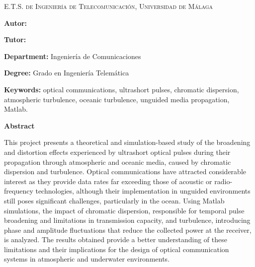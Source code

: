 
\pagestyle{fancy}

\begin{center}
	\scshape
	E.T.S. de Ingeniería de Telecomunicación, Universidad de Málaga
\end{center}

\bigskip

\begin{center}
	\Large \scshape
	\textbf{\tfgtitlenameENG}
\end{center}

\bigskip \bigskip \bigskip

\begin{minipage}{\textwidth}

\textbf{Autor:} \tfgauthorname

\medskip

\textbf{Tutor:} \tfgtutorname



\medskip


\textbf{Department:} Ingeniería de Comunicaciones

\medskip

\textbf{Degree:} Grado en Ingeniería Telemática

\medskip

\textbf{Keywords:} optical communications, ultrashort pulses, chromatic dispersion, atmospheric turbulence, oceanic turbulence, unguided media propagation, Matlab.

\bigskip \bigskip


\end{minipage}

\begin{center}
	\textbf{Abstract}
\end{center}


This project presents a theoretical and simulation-based study of the broadening and distortion effects experienced by ultrashort optical pulses during their propagation through atmospheric and oceanic media, caused by chromatic dispersion and turbulence. Optical communications have attracted considerable interest as they provide data rates far exceeding those of acoustic or radio-frequency technologies, although their implementation in unguided environments still poses significant challenges, particularly in the ocean.
Using Matlab simulations, the impact of chromatic dispersion, responsible for temporal pulse broadening and limitations in transmission capacity, and turbulence, introducing phase and amplitude fluctuations that reduce the collected power at the receiver, is analyzed. The results obtained provide a better understanding of these limitations and their implications for the design of optical communication systems in atmospheric and underwater environments. 


\blankpage
